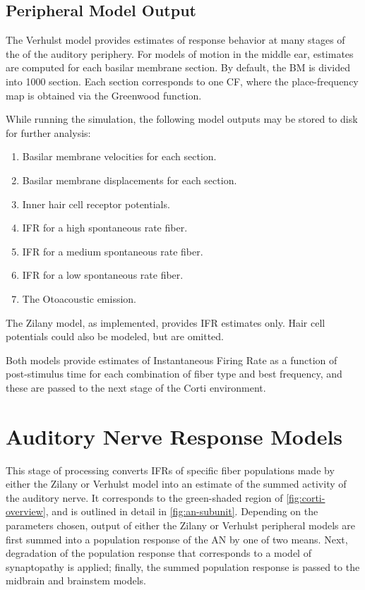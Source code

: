 \subsection{Peripheral Model Output} %
\label{sub:peripheral_model_output}
The Verhulst model provides estimates of response behavior at many stages of the of the auditory periphery.   For models of motion in the middle ear, estimates are computed for each basilar membrane section.  By default, the BM is divided into 1000 section.  Each section corresponds to one CF, where the place-frequency map is obtained via the Greenwood function.

 While running the simulation, the following model outputs may be stored to disk for further analysis: 
\begin{enumerate}
	\item Basilar membrane velocities for each section.
	\item Basilar membrane displacements for each section.
	\item Inner hair cell receptor potentials. 
	\item IFR for a high spontaneous rate fiber.
	\item IFR for a medium spontaneous rate fiber.
	\item IFR for a low spontaneous rate fiber. 
	\item The Otoacoustic emission. 
\end{enumerate}

The Zilany model, as implemented, provides IFR estimates only.  Hair cell potentials could also be modeled, but are omitted.

Both models provide estimates of Instantaneous Firing Rate as a function of post-stimulus time for each combination of fiber type and best frequency, and these are passed to the next stage of the Corti environment.


\section{Auditory Nerve Response Models} %
\label{sec:auditory_nerve_response_models}
This stage of processing converts IFRs of specific fiber populations made by either the Zilany or Verhulst model into an estimate of the summed activity of the auditory nerve. It corresponds to the green-shaded region of \autoref{fig:corti-overview}, and is outlined in detail in \autoref{fig:an-subunit}.  Depending on the parameters chosen, output of either the Zilany or Verhulst peripheral models are first summed into a population response of the AN by one of two means.  Next, degradation of the population response that corresponds to a model of synaptopathy is applied; finally, the summed population response is passed to the midbrain and brainstem models.

